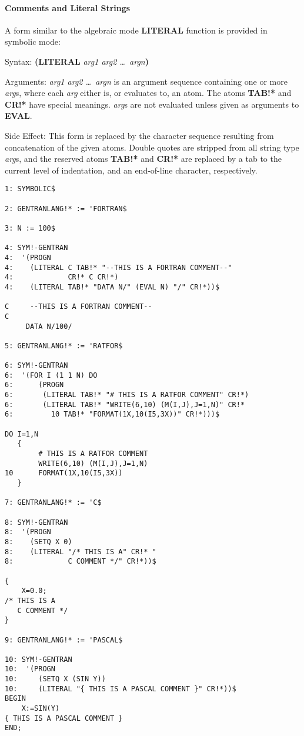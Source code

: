 \paragraph{Comments and Literal Strings}
 
A form similar to the algebraic mode {\bf LITERAL} function is provided in
symbolic mode:
\begin{describe}{Syntax:}
{\bf (LITERAL} {\it arg1 arg2 \dots\  argn\/}{\bf )}
\end{describe} 
\begin{describe}{Arguments:}
{\it arg1 arg2 \dots\  argn\/} is an argument sequence containing one or more
{\it arg\/}s, where each {\it arg\/} either is, or evaluates to, an atom.  The
atoms {\bf TAB!*} and {\bf CR!*} have special meanings. 
 {\it arg\/}s are
not evaluated unless given as arguments to {\bf EVAL}.
\end{describe} 
\begin{describe}{Side Effect:}
This form is replaced by the character sequence resulting from
concatenation of the given atoms.  Double quotes are stripped from
all string type {\it arg\/}s, and the reserved atoms {\bf TAB!*}
and {\bf CR!*} are replaced by a tab to the current level of indentation,
and an end-of-line character, respectively.
\end{describe} 
\begin{describe}{\example}
\begin{verbatim}
1: SYMBOLIC$ 

2: GENTRANLANG!* := 'FORTRAN$

3: N := 100$

4: SYM!-GENTRAN 
4:  '(PROGN 
4:    (LITERAL C TAB!* "--THIS IS A FORTRAN COMMENT--"
4:             CR!* C CR!*) 
4:    (LITERAL TAB!* "DATA N/" (EVAL N) "/" CR!*))$

C     --THIS IS A FORTRAN COMMENT--
C
     DATA N/100/

5: GENTRANLANG!* := 'RATFOR$

6: SYM!-GENTRAN 
6:  '(FOR I (1 1 N) DO 
6:      (PROGN 
6:       (LITERAL TAB!* "# THIS IS A RATFOR COMMENT" CR!*) 
6:       (LITERAL TAB!* "WRITE(6,10) (M(I,J),J=1,N)" CR!* 
6:         10 TAB!* "FORMAT(1X,10(I5,3X))" CR!*)))$

DO I=1,N
   {
        # THIS IS A RATFOR COMMENT
        WRITE(6,10) (M(I,J),J=1,N)
10      FORMAT(1X,10(I5,3X))
   }

7: GENTRANLANG!* := 'C$

8: SYM!-GENTRAN 
8:  '(PROGN 
8:    (SETQ X 0) 
8:    (LITERAL "/* THIS IS A" CR!* "
8:             C COMMENT */" CR!*))$

{
    X=0.0;
/* THIS IS A
   C COMMENT */
}

9: GENTRANLANG!* := 'PASCAL$

10: SYM!-GENTRAN
10:  '(PROGN
10:     (SETQ X (SIN Y))
10:     (LITERAL "{ THIS IS A PASCAL COMMENT }" CR!*))$
BEGIN
    X:=SIN(Y)
{ THIS IS A PASCAL COMMENT }
END;

\end{verbatim}
\end{describe} 

